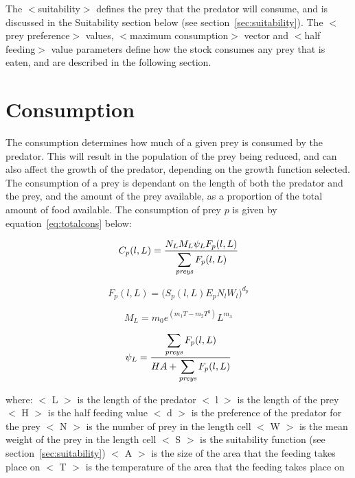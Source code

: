 \documentclass[10pt,twoside]{book}
\begin{document}
The $<$suitability$>$ defines the prey that the predator will consume, and is discussed in the Suitability section below (see section~\ref{sec:suitability}).  The $<$prey preference$>$ values, $<$maximum consumption$>$ vector and $<$half feeding$>$ value parameters define how the stock consumes any prey that is eaten, and are described in the following section.

\section{Consumption}\label{sec:consumption}
The consumption determines how much of a given prey is consumed by the predator.  This will result in the population of the prey being reduced, and can also affect the growth of the predator, depending on the growth function selected.  The consumption of a prey is dependant on the length of both the predator and the prey, and the amount of the prey available, as a proportion of the total amount of food available.  The consumption of prey $p$ is given by equation~\ref{eq:totalcons} below:

\begin{equation}\label{eq:totalcons}
C_{p}(l, L) = \frac{N_{L} M_{L} \psi_{L} F_{p}(l, L)}{\displaystyle \sum_{\it preys} F_{p}(l, L)}
\end{equation}

\begin{equation}\label{eq:preycons}
F_{p}(l, L) =\Big( S_{p}(l, L) E_{p} N_{l} W_{l} \Big) ^{d_{p}}
\end{equation}

\begin{equation}\label{eq:maxcons}
M_{L} = m_{0} e^{(m_{1}T - m_{2}T^3)} L^{m_{3}}
\end{equation}

\begin{equation}\label{eq:feedlevel}
\psi_{L} = \frac{\displaystyle \sum_{\it preys} F_{p}(l, L)}{H A + \displaystyle \sum_{\it preys} F_{p}(l, L)}
\end{equation}

where:\newline
$<$ L $>$ is the length of the predator\newline
$<$ l $>$ is the length of the prey\newline
$<$ H $>$ is the half feeding value\newline
$<$ d $>$ is the preference of the predator for the prey\newline
$<$ N $>$ is the number of prey in the length cell\newline
$<$ W $>$ is the mean weight of the prey in the length cell\newline
$<$ S $>$ is the suitability function (see section~\ref{sec:suitability})\newline
$<$ A $>$ is the size of the area that the feeding takes place on\newline
$<$ T $>$ is the temperature of the area that the feeding takes place on
\end{document}

